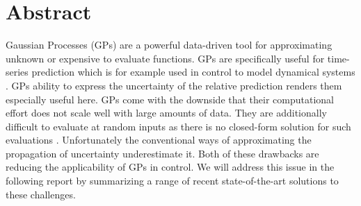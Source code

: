 \section*{Abstract}

Gaussian Processes (GPs) are a powerful data-driven tool for approximating unknown or expensive to evaluate functions. GPs are specifically useful for time-series prediction which is for example used in control  to model dynamical systems \cite{Paper1:GP_for_MPC}. GPs ability to express the uncertainty of the relative prediction renders them especially useful here.  GPs come with the downside that their computational effort does not scale well with large amounts of data. They are additionally difficult to evaluate at random inputs as there is no closed-form solution for such evaluations \cite{Paper2:UncertainInputPredictions}. Unfortunately the conventional ways of approximating the propagation of uncertainty underestimate it. Both of these drawbacks are reducing the applicability of GPs in control. We will address this issue in the following report by summarizing a range of recent state-of-the-art solutions to these challenges.